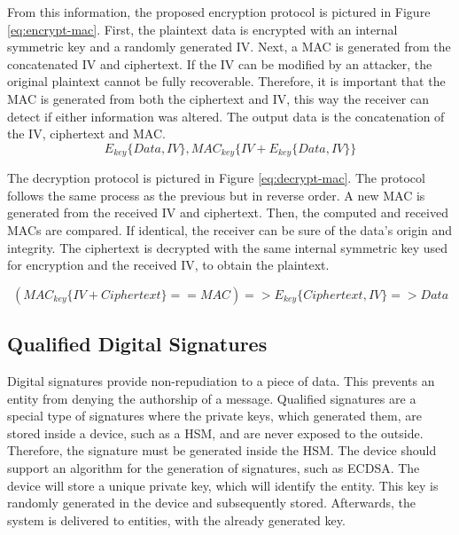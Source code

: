 From this information, the proposed encryption protocol is pictured in Figure \ref{eq:encrypt-mac}. First, the plaintext data is encrypted with an internal symmetric key and a randomly generated IV. Next, a MAC is generated from the concatenated IV and ciphertext.
If the IV can be modified by an attacker, the original plaintext cannot be fully recoverable. Therefore, it is important that the MAC is generated from both the ciphertext and IV, this way the receiver can detect if either information was altered.
The output data is the concatenation of the IV, ciphertext and MAC.
\begin{equation}
	\label{eq:encrypt-mac}
	E_{key}\{Data, IV\}, MAC_{key}\{IV+E_{key}\{Data, IV\}\}
\end{equation}

The decryption protocol is pictured in Figure \ref{eq:decrypt-mac}. The protocol follows the same process as the previous but in reverse order. A new MAC is generated from the received IV and ciphertext. Then, the computed and received MACs are compared. If identical, the receiver can be sure of the data's origin and integrity. The ciphertext is decrypted with the same internal symmetric key used for encryption and the received IV, to obtain the plaintext.

\begin{equation}
	\label{eq:decrypt-mac}
	(MAC_{key}\{IV+Ciphertext\} == MAC) => E_{key}\{Ciphertext, IV\} => Data
\end{equation}

\subsection{Qualified Digital Signatures}\label{chap:arch:services:signatures}

Digital signatures provide non-repudiation to a piece of data. This prevents an entity from denying the authorship of a message. Qualified signatures are a special type of signatures where the private keys, which generated them, are stored inside a device, such as a HSM, and are never exposed to the outside.
Therefore, the signature must be generated inside the HSM. The device should support an algorithm for the generation of signatures, such as ECDSA.
The device will store a unique private key, which will identify the entity. This key is randomly generated in the device and subsequently stored. Afterwards, the system is delivered to entities, with the already generated key.

